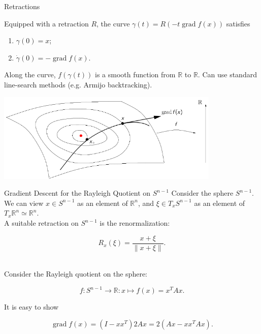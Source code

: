\documentclass[xcolor=dvipsnames,t]{beamer} %
\newcommand{\reals}{\mathbb{R}}
\begin{document}
\begin{frame}{Retractions}
   
   Equipped with a retraction $R$, the curve $\gamma(t) = R(-t\operatorname{grad}f(x))$ satisfies
   \begin{enumerate}[1.]
      \item $\gamma(0)=x$;
      \item $\dot{\gamma}(0)=-\operatorname{grad}f(x)$.
   \end{enumerate}
     
   Along the curve, $f(\gamma(t))$ is a smooth function from $\reals$ to $\reals$.  Can use standard line-search methods (e.g. Armijo backtracking).

   \begin{center}
      \includegraphics[width=0.8\textwidth]{figures/GD_M.pdf}
   \end{center}
  
\end{frame}


\begin{frame}{Gradient Descent for the Rayleigh Quotient on $S^{n-1}$}
   Consider the sphere $S^{n-1}$.  We can view $x\in S^{n-1}$ as an element of $\reals^n$, and $\xi\in T_xS^{n-1}$ as an element of $T_x\reals^n\simeq \reals^n$.\\[.5em]

   A suitable retraction on $S^{n-1}$ is the renormalization:

   \[ R_x(\xi) = \dfrac{x+\xi}{\|x+\xi\|}. \] 
   
   ~\\
   Consider the Rayleigh quotient on the sphere:
   
   \[ f:S^{n-1}\to \reals: x\mapsto f(x) =x^TAx. \] 

   It is easy to show
   
   \[ \operatorname{grad}f(x)=(I-xx^T)2Ax = 2(Ax-xx^TAx). \] 

\end{frame}
\end{document}
